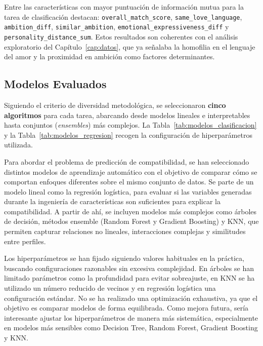 Entre las características con mayor puntuación de información mutua para la tarea de clasificación destacan: \texttt{overall\_match\_score}, \texttt{same\_love\_language}, \texttt{ambition\_diff}, \texttt{similar\_ambition}, \nolinkurl{emotional\_expressiveness\_diff} y \texttt{personality\_distance\_sum}. Estos resultados son coherentes con el análisis exploratorio del Capítulo~\ref{cap:datos}, que ya señalaba la homofilia en el lenguaje del amor y la proximidad en ambición como factores determinantes.

\subsection{Modelos Evaluados}
\label{subsec:modelos_evaluados}

Siguiendo el criterio de diversidad metodológica, se seleccionaron \textbf{cinco algoritmos} para cada tarea, abarcando desde modelos lineales e interpretables hasta conjuntos (\textit{ensembles}) más complejos. La Tabla~\ref{tab:modelos_clasificacion} y la Tabla~\ref{tab:modelos_regresion} recogen la configuración de hiperparámetros utilizada.

Para abordar el problema de predicción de compatibilidad, se han seleccionado distintos modelos de aprendizaje automático con el objetivo de comparar cómo se comportan enfoques diferentes sobre el mismo conjunto de datos. Se parte de un modelo lineal como la regresión logística, para evaluar si las variables generadas durante la ingeniería de características son suficientes para explicar la compatibilidad. A partir de ahí, se incluyen modelos más complejos como árboles de decisión, métodos ensemble (Random Forest y Gradient Boosting) y KNN, que permiten capturar relaciones no lineales, interacciones complejas y similitudes entre perfiles.

Los hiperparámetros se han fijado siguiendo valores habituales en la práctica, buscando configuraciones razonables sin excesiva complejidad. En árboles se han limitado parámetros como la profundidad para evitar sobreajuste, en KNN se ha utilizado un número reducido de vecinos y en regresión logística una configuración estándar. No se ha realizado una optimización exhaustiva, ya que el objetivo es comparar modelos de forma equilibrada. Como mejora futura, sería interesante ajustar los hiperparámetros de manera más sistemática, especialmente en modelos más sensibles como Decision Tree, Random Forest, Gradient Boosting y KNN.

